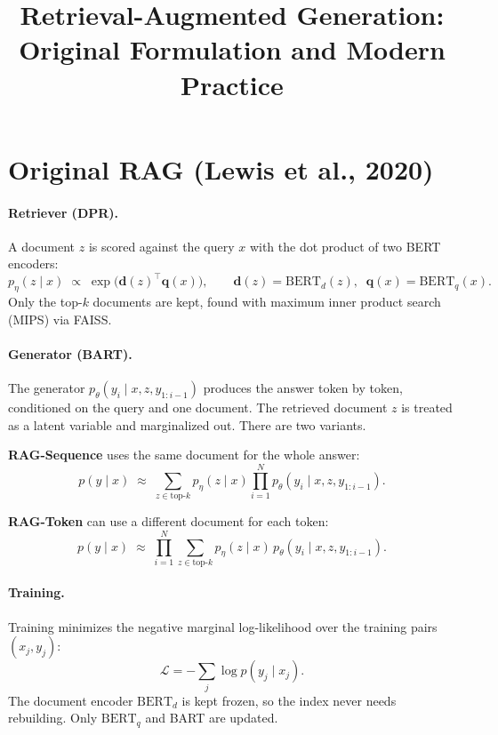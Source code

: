 \documentclass[11pt]{article}
\title{Retrieval-Augmented Generation: Original Formulation and Modern Practice}
\date{}
\begin{document}
\maketitle

\section{Original RAG (Lewis et al., 2020)}

\paragraph{Retriever (DPR).}
A document $z$ is scored against the query $x$ with the dot product of two BERT encoders:
\begin{equation}
  p_\eta(z \mid x) \;\propto\; \exp\!\big(\mathbf{d}(z)^{\top}\mathbf{q}(x)\big),
  \qquad
  \mathbf{d}(z)=\mathrm{BERT}_d(z),\;\;
  \mathbf{q}(x)=\mathrm{BERT}_q(x).
\end{equation}
Only the top-$k$ documents are kept, found with maximum inner product search (MIPS) via FAISS.

\paragraph{Generator (BART).}
The generator $p_\theta(y_i \mid x, z, y_{1:i-1})$ produces the answer token by token, conditioned on the query and one document. The retrieved document $z$ is treated as a latent variable and marginalized out. There are two variants.

\medskip
\noindent\textbf{RAG-Sequence} uses the same document for the whole answer:
\begin{equation}
  p(y \mid x) \;\approx\; \sum_{z \in \text{top-}k} p_\eta(z \mid x)
  \prod_{i=1}^{N} p_\theta(y_i \mid x, z, y_{1:i-1}).
  \label{eq:rag-seq}
\end{equation}

\noindent\textbf{RAG-Token} can use a different document for each token:
\begin{equation}
  p(y \mid x) \;\approx\; \prod_{i=1}^{N} \sum_{z \in \text{top-}k} p_\eta(z \mid x)\,
  p_\theta(y_i \mid x, z, y_{1:i-1}).
  \label{eq:rag-tok}
\end{equation}

\paragraph{Training.}
Training minimizes the negative marginal log-likelihood over the training pairs $(x_j, y_j)$:
\begin{equation}
  \mathcal{L} = -\sum_j \log p(y_j \mid x_j).
  \label{eq:loss}
\end{equation}
The document encoder $\mathrm{BERT}_d$ is kept frozen, so the index never needs rebuilding. Only $\mathrm{BERT}_q$ and BART are updated.
\end{document}

